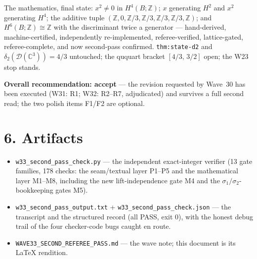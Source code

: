 \documentclass[11pt,a4paper]{article}
\newcommand{\Z}{\mathbb{Z}}
\newcommand{\C}{\mathbb{C}}
\begin{document}
The mathematics, final state: $x^2\ne 0$ in $H^4(B;\Z)$; $x$ generating
$H^2$ and $x^2$ generating $H^4$; the additive tuple
$(\Z,0,\Z/3,\Z/3,\Z/3,\Z/3,\Z)$; and $H^6(B;\Z)\cong\Z$ with the
discriminant twice a generator --- hand-derived, machine-certified,
independently re-implemented, referee-verified, lattice-gated,
referee-complete, and now second-pass confirmed. \texttt{thm:state-d2} and
$\delta_2(\mathcal D(\C^3))=4/3$ untouched; the ququart bracket
$[4/3,\,3/2]$ open; the W23 stop stands.

\textbf{Overall recommendation: accept} --- the revision requested by
Wave~30 has been executed (W31: R1; W32: R2--R7, adjudicated) and survives
a full second read; the two polish items F1/F2 are optional.

\section*{6. Artifacts}

\begin{itemize}[leftmargin=1.4em,itemsep=2pt]
\item \texttt{w33\_second\_pass\_check.py} --- the independent exact-integer
verifier (13 gate families, 178 checks: the seam/textual layer P1--P5 and
the mathematical layer M1--M8, including the new lift-independence gate M4
and the $\sigma_1/\sigma_2$-bookkeeping gates M5).
\item \texttt{w33\_second\_pass\_output.txt} +
\texttt{w33\_second\_pass\_check.json} --- the transcript and the
structured record (all PASS, exit 0), with the honest debug trail of the
four checker-code bugs caught en route.
\item \texttt{WAVE33\_SECOND\_REFEREE\_PASS.md} --- the wave note; this
document is its LaTeX rendition.
\end{itemize}
\end{document}
